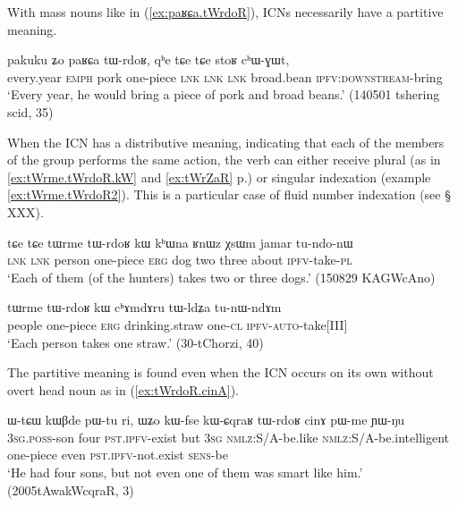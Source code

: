 With mass nouns like  in (\ref{ex:paʁɕa.tWrdoR}), ICNs necessarily have a partitive meaning.

\begin{exe}
\ex \label{ex:paʁɕa.tWrdoR}
\gll pakuku ʑo paʁɕa tɯ-rdoʁ, qʰe tɕe tɕe stoʁ cʰɯ-ɣɯt, \\
every.year \textsc{emph} pork one-piece \textsc{lnk} \textsc{lnk} \textsc{lnk} broad.bean \textsc{ipfv}:\textsc{downstream}-bring \\
\glt `Every year, he would bring a piece of pork and broad beans.' (140501 tshering scid, 35)
\end{exe} 

When the ICN has a distributive meaning, indicating that each of the members of the group performs the same action, the verb can either receive plural (as in \ref{ex:tWrme.tWrdoR.kW} and \ref{ex:tWrZaR} p.\pageref{ex:tWrZaR}) or singular indexation (example \ref{ex:tWrme.tWrdoR2}). This is a particular case of fluid number indexation (see § XXX).

\begin{exe}
\ex \label{ex:tWrme.tWrdoR.kW}
\gll  tɕe tɕe tɯrme tɯ-rdoʁ kɯ kʰɯna ʁnɯz χsɯm jamar tu-ndo-nɯ \\
\textsc{lnk} \textsc{lnk}  person one-piece \textsc{erg} dog two three about \textsc{ipfv}-take-\textsc{pl} \\
\glt `Each of them (of the hunters) takes two or three dogs.' (150829 KAGWcAno)
\end{exe} 

\begin{exe}
\ex \label{ex:tWrme.tWrdoR2}
\gll tɯrme tɯ-rdoʁ kɯ cʰɤmdɤru tɯ-ldʑa tu-nɯ-ndɤm  \\
people one-piece \textsc{erg} drinking.straw one-\textsc{cl} \textsc{ipfv-auto}-take[III] \\
\glt `Each person takes one straw.' (30-tChorzi, 40)
\end{exe}

The partitive meaning is found even when the ICN occurs on its own without overt head noun as in (\ref{ex:tWrdoR.cinA}).

\begin{exe}
\ex \label{ex:tWrdoR.cinA}
\gll ɯ-tɕɯ kɯβde pɯ-tu ri, ɯʑo kɯ-fse kɯ-ɕqraʁ tɯ-rdoʁ cinɤ pɯ-me ɲɯ-ŋu 	\\
\textsc{3sg.poss}-son four \textsc{pst.ipfv}-exist but \textsc{3sg} \textsc{nmlz}:S/A-be.like \textsc{nmlz}:S/A-be.intelligent one-piece even \textsc{pst.ipfv}-not.exist \textsc{sens}-be \\
\glt `He had four sons, but not even one of them was smart like him.' (2005tAwakWcqraR, 3)
\end{exe} 


